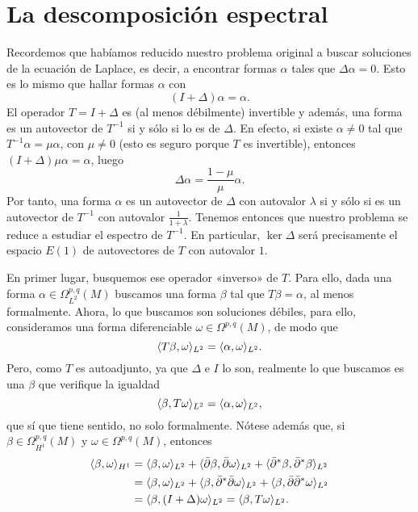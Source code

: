 \documentclass[12pt,a4paper]{article}
\theoremstyle{definition} \newtheorem{defn}[thm]{Definición}
\theoremstyle{definition} \newtheorem{ejemplo}[thm]{Ejemplo}
\theoremstyle{definition} \newtheorem{ejercicio}[thm]{Ejercicio}
\theoremstyle{remark} \newtheorem*{obs}{Observación}
\DeclarePairedDelimiter\esc{\langle}{\rangle}
\newcommand{\dol}{\bar{\partial}}
\begin{document}
    \section{La descomposición espectral}
    Recordemos que habíamos reducido nuestro problema original a buscar soluciones de la ecuación de Laplace, es decir, a encontrar formas $\alpha$ tales que $\Delta \alpha =0$. Esto es lo mismo que hallar formas $\alpha$ con
    \begin{equation*}
      (I + \Delta) \alpha =\alpha.
    \end{equation*}
    El operador $T=I+\Delta$ es (al menos débilmente) invertible y además, una forma es un autovector de $T^{-1}$ si y sólo si lo es de $\Delta$. En efecto, si existe $\alpha\neq 0$ tal que $T^{-1}\alpha = \mu \alpha$, con $\mu \neq 0$ (esto es seguro porque $T$ es invertible), entonces $(I+\Delta)\mu \alpha = \alpha$, luego
    \begin{equation*}
      \Delta \alpha = \frac{1-\mu}{\mu}\alpha.
    \end{equation*}
    Por tanto, una forma $\alpha$ es un autovector de $\Delta$ con autovalor $\lambda$ si y sólo si es un autovector de $T^{-1}$ con autovalor $\frac{1}{1+\lambda}$. Tenemos entonces que nuestro problema se reduce a estudiar el espectro de $T^{-1}$. En particular, $\ker \Delta$ será precisamente el espacio $E(1)$ de autovectores de $T$ con autovalor $1$.

    En primer lugar, busquemos ese operador «inverso» de $T$. Para ello, dada una forma $\alpha\in \Omega^{p,q}_{L^2}(M)$ buscamos una forma $\beta$ tal que $T\beta=\alpha$, al menos formalmente. Ahora, lo que buscamos son soluciones débiles, para ello, consideramos una forma diferenciable $\omega\in\Omega^{p,q}(M) $, de modo que
    \begin{equation*}
      \esc{T\beta,\omega}_{L^2}=\esc{\alpha,\omega}_{L^2}.
    \end{equation*}
    Pero, como $T$ es autoadjunto, ya que $\Delta$ e $I$ lo son, realmente lo que buscamos es una $\beta$ que verifique la igualdad
    \begin{equation*}
      \esc{\beta,T\omega}_{L^2}=\esc{\alpha,\omega}_{L^2},
    \end{equation*}
    que sí que tiene sentido, no solo formalmente. Nótese además que, si $\beta \in \Omega^{p,q}_{H^1}(M)$ y $\omega \in \Omega^{p,q}(M)$, entonces
    \begin{align*}
      \esc{\beta,\omega}_{H^1}&=\esc{\beta,\omega}_{L^2}+\esc{\dol \beta,\dol \omega}_{L^2}+ \esc{\dol^*\beta,\dol^*\beta}_{L^2}\\ 
      &=\esc{\beta,\omega}_{L^2} + \esc{\beta,\dol^*\dol \omega}_{L^2}+ \esc{\beta, \dol \dol^* \omega}_{L^2} \\
      &= \esc{\beta,(I+\Delta)\omega}_{L^2}=\esc{\beta,T\omega}_{L^2}.
    \end{align*}
\end{document}
